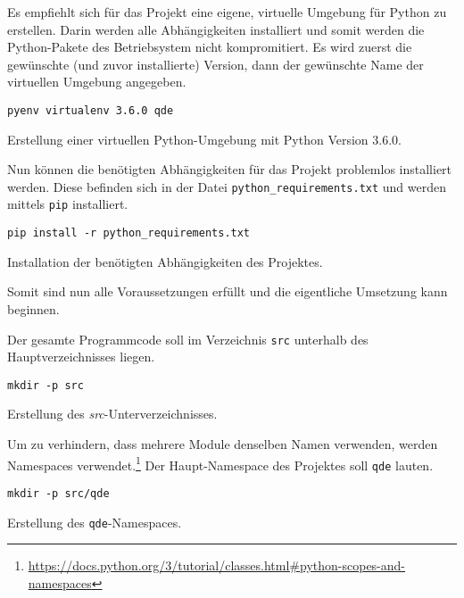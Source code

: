 \documentclass[10pt, openright, notitlepage]{scrreprt}
\begin{document}
Es empfiehlt sich für das Projekt eine eigene, virtuelle Umgebung für Python zu
erstellen. Darin werden alle Abhängigkeiten installiert und somit werden
die Python-Pakete des Betriebsystem nicht kompromitiert. Es wird zuerst die
gewünschte (und zuvor installierte) Version, dann der gewünschte Name der
virtuellen Umgebung angegeben.

\begin{listing}[H]
\begin{verbatim}
pyenv virtualenv 3.6.0 qde
\end{verbatim}
\caption{\label{org87cd85f}
Erstellung einer virtuellen Python-Umgebung mit Python Version 3.6.0.}
\end{listing}

Nun können die benötigten Abhängigkeiten für das Projekt problemlos installiert
werden. Diese befinden sich in der Datei \texttt{python\_requirements.txt} und werden
mittels \texttt{pip} installiert.

\begin{listing}[H]
\begin{verbatim}
pip install -r python_requirements.txt
\end{verbatim}
\caption{\label{orgd7beb0a}
Installation der benötigten Abhängigkeiten des Projektes.}
\end{listing}

Somit sind nun alle Voraussetzungen erfüllt und die eigentliche Umsetzung kann
beginnen.

Der gesamte Programmcode soll im Verzeichnis \texttt{src} unterhalb des
Hauptverzeichnisses liegen.

\begin{listing}[H]
\begin{verbatim}
mkdir -p src
\end{verbatim}
\caption{\label{orge0b3285}
Erstellung des \emph{src}-Unterverzeichnisses.}
\end{listing}

Um zu verhindern, dass mehrere Module denselben Namen verwenden, werden
Namespaces verwendet.\footnote{\url{https://docs.python.org/3/tutorial/classes.html\#python-scopes-and-namespaces}} Der Haupt-Namespace des Projektes soll \texttt{qde} lauten.

\begin{listing}[H]
\begin{verbatim}
mkdir -p src/qde
\end{verbatim}
\caption{\label{org2076295}
Erstellung des \texttt{qde}-Namespaces.}
\end{listing}
\end{document}
